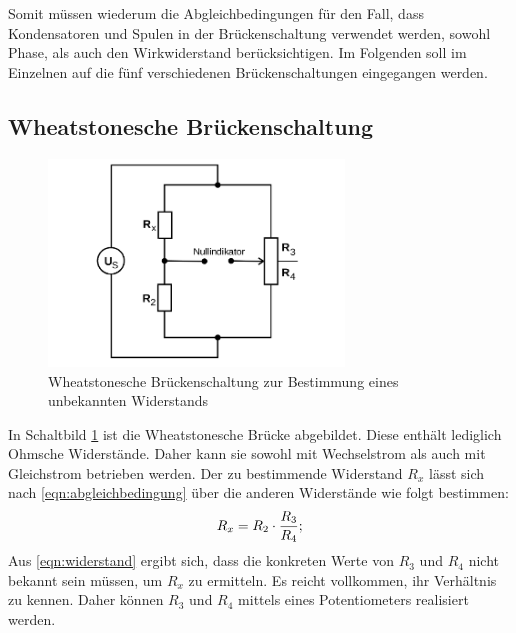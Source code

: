 Somit müssen wiederum die Abgleichbedingungen für den Fall, dass Kondensatoren und Spulen in der Brückenschaltung verwendet werden, sowohl Phase, als auch den Wirkwiderstand berücksichtigen.
Im Folgenden soll im Einzelnen auf die fünf verschiedenen Brückenschaltungen eingegangen werden.

\subsection{Wheatstonesche Brückenschaltung}
\begin{figure}
  \centering
  \includegraphics[width=0.7\textwidth]{Bilder/Wheatstone_bruecke.png}
  \caption{Wheatstonesche Brückenschaltung zur Bestimmung eines unbekannten Widerstands \cite{Anleitung}}
  \label{fig:wheatstonebrücke}
\end{figure}

In Schaltbild \ref{fig:wheatstonebrücke} ist die Wheatstonesche Brücke abgebildet. Diese enthält lediglich Ohmsche Widerstände. Daher kann sie sowohl mit Wechselstrom als auch mit Gleichstrom betrieben werden.
Der zu bestimmende Widerstand $R_x$ lässt sich nach \eqref{eqn:abgleichbedingung} über die anderen Widerstände wie folgt bestimmen:
\begin{equation}
  \centering
  R_x=R_2 \cdot \frac{R_3}{R_4};
\label{eqn:widerstand}
\end{equation}
Aus \eqref{eqn:widerstand} ergibt sich, dass die konkreten Werte von $R_3$ und $R_4$ nicht bekannt sein müssen, um $R_x$ zu ermitteln. Es reicht vollkommen, ihr Verhältnis zu kennen.
Daher können $R_3$ und $R_4$ mittels eines Potentiometers realisiert werden.

